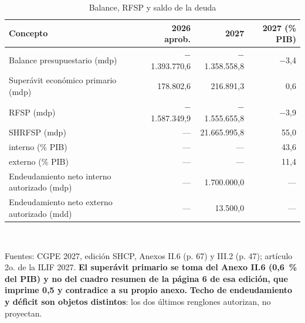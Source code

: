 \begin{table}[htbp]\centering\small
\caption{Balance, RFSP y saldo de la deuda}\label{cua:deuda}
\begin{tabular}{lrrr}
\toprule
Concepto & 2026 aprob. & 2027 & 2027 (\% PIB) \\
\midrule
Balance presupuestario (mdp) & $-$1.393.770,6 & $-$1.358.558,8 & $-$3,4 \\
Superávit económico primario (mdp) & 178.802,6 & 216.891,3 & 0,6 \\
RFSP (mdp) & $-$1.587.349,9 & $-$1.555.655,8 & $-$3,9 \\
SHRFSP (mdp) & --- & 21.665.995,8 & 55,0 \\
\quad interno (\% PIB) & --- & --- & 43,6 \\
\quad externo (\% PIB) & --- & --- & 11,4 \\
Endeudamiento neto interno autorizado (mdp) & --- & 1.700.000,0 & --- \\
Endeudamiento neto externo autorizado (mdd) & --- & 13.500,0 & --- \\
\bottomrule
\end{tabular}
\\[2pt]\begin{minipage}{0.92\textwidth}\scriptsize Fuentes: CGPE 2027, edición SHCP, Anexos II.6 (p. 67) y III.2 (p. 47); artículo 2o. de la ILIF 2027. \textbf{El superávit primario se toma del Anexo II.6 (0,6~\% del PIB) y no del cuadro resumen de la página 6 de esa edición, que imprime 0,5 y contradice a su propio anexo.} \textbf{Techo de endeudamiento y déficit son objetos distintos}: los dos últimos renglones autorizan, no proyectan.\end{minipage}
\end{table}
